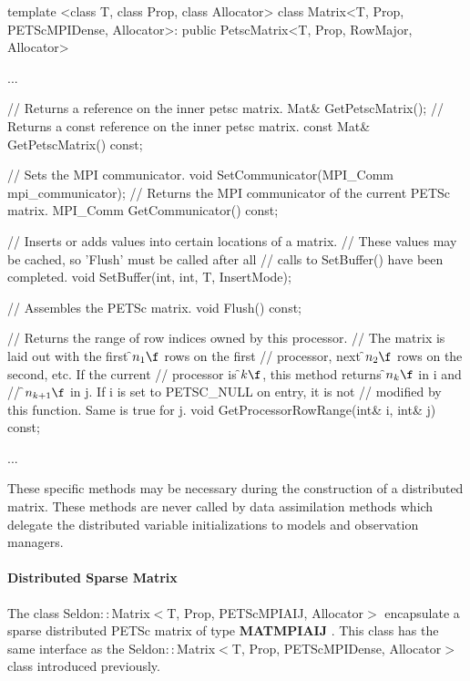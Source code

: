 \begin{frame_cpp}
template <class T, class Prop, class Allocator>
class Matrix<T, Prop, PETScMPIDense, Allocator>:
public PetscMatrix<T, Prop, RowMajor, Allocator>
{
	...

    // Returns a reference on the inner petsc matrix.
    Mat& GetPetscMatrix();
    // Returns a const reference on the inner petsc matrix.
    const Mat& GetPetscMatrix() const;


    // Sets the MPI communicator.
    void SetCommunicator(MPI_Comm mpi_communicator);
    // Returns the MPI communicator of the current PETSc matrix.
    MPI_Comm GetCommunicator() const;

    // Inserts or adds values into certain locations of a matrix.
    // \warning These values may be cached, so 'Flush' must be called after all
    // calls to SetBuffer() have been completed.
    void SetBuffer(int, int, T, InsertMode);

    // Assembles the PETSc matrix.
    void Flush() const;

    // Returns the range of row indices owned by this processor.
    // The matrix is laid out with the first \f$n_1\f$ rows on the first
    // processor, next \f$n_2\f$ rows on the second, etc. If the current
    // processor is \f$k\f$, this method returns \f$n_k\f$ in \a i and
    // \f$n_{k+1}\f$ in \a j. If \a i is set to PETSC_NULL on entry, it is not
    // modified by this function. Same is true for \a j.
    void GetProcessorRowRange(int& i, int& j) const;

    ...
}
\end{frame_cpp}


\par These specific methods may be necessary during the construction of a distributed matrix. These methods are never called by data assimilation methods which delegate the distributed variable initializations to models and observation managers.

\hypertarget{seq-par-ds-smatrix}{}\paragraph{Distributed Sparse Matrix}\label{seq-par-ds-smatrix}

The class Seldon$::$Matrix$<$T, Prop, PETScMPIAIJ, Allocator$>$  encapsulate a sparse distributed PETSc matrix of type \textbf{MATMPIAIJ} . This class has the same interface as the  Seldon$::$Matrix$<$T, Prop, PETScMPIDense, Allocator$>$ class  introduced previously.

